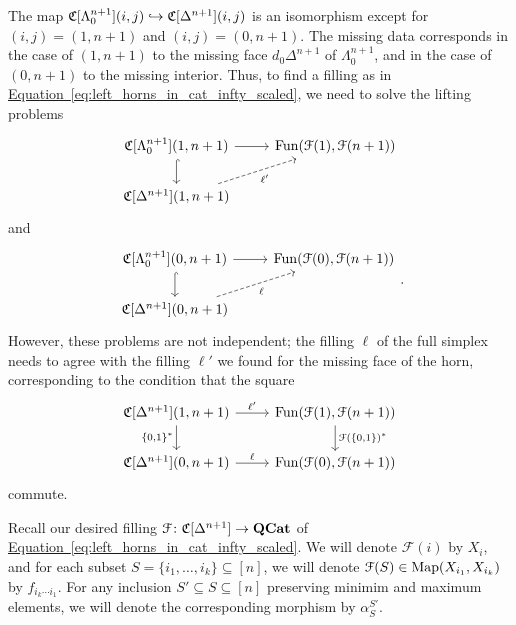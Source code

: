 \documentclass[main.tex]{subfiles}
\begin{document}
The map $\mathfrak{C}[\Lambda^{n+1}_{0}](i, j) \hookrightarrow \mathfrak{C}[\Delta^{n+1}](i, j)$ is an isomorphism except for $(i, j) = (1, n+1)$ and $(i, j) = (0, n+1)$. The missing data corresponds in the case of $(1, n+1)$ to the missing face $d_{0}\Delta^{n+1}$ of $\Lambda^{n+1}_{0}$, and in the case of $(0, n+1)$ to the missing interior. Thus, to find a filling as in \hyperref[eq:left_horns_in_cat_infty_scaled]{Equation~\ref*{eq:left_horns_in_cat_infty_scaled}}, we need to solve the lifting problems
\begin{equation}
  \label{eq:lifting_problem_1}
  \begin{tikzcd}
    \C[\Lambda^{n+1}_{0}](1, n+1)
    \arrow[r]
    \arrow[d, hook]
    & \Fun(\mathcal{F}(1), \mathcal{F}(n+1))
    \\
    \C[\Delta^{n+1}](1, n+1)
    \arrow[ur, dashed, swap, "\ell'"]
  \end{tikzcd}
\end{equation}
and
\begin{equation}
  \label{eq:lifting_problem_2}
  \begin{tikzcd}
    \C[\Lambda^{n+1}_{0}](0, n+1)
    \arrow[r]
    \arrow[d, hook]
    & \Fun(\mathcal{F}(0), \mathcal{F}(n+1))
    \\
    \C[\Delta^{n+1}](0, n+1)
    \arrow[ur, dashed, swap, "\ell"]
  \end{tikzcd}.
\end{equation}
However, these problems are not independent; the filling $\ell$ of the full simplex needs to agree with the filling $\ell'$ we found for the missing face of the horn, corresponding to the condition that the square
\begin{equation}
  \label{eq:lifting_problem_compatibility_condition}
  \begin{tikzcd}
    \C[\Delta^{n+1}](1, n+1)
    \arrow[r, "\ell'"]
    \arrow[d, swap, "{\{0,1\}}^{*}"]
    & \Fun(\mathcal{F}(1), \mathcal{F}(n+1))
    \arrow[d, "\mathcal{F}({\{0, 1\}})^{*}"]
    \\
    \C[\Delta^{n+1}](0, n+1)
    \arrow[r, "\ell"]
    & \Fun(\mathcal{F}(0), \mathcal{F}(n+1))
  \end{tikzcd}
\end{equation}
commute.

\begin{notation}
  \label{notation:simplicial_lifting}
  Recall our desired filling $\mathcal{F}\colon \mathfrak{C}[\Delta^{n+1}] \to \mathbf{QCat}$ of \hyperref[eq:left_horns_in_cat_infty_scaled]{Equation~\ref*{eq:left_horns_in_cat_infty_scaled}}. We will denote $\mathcal{F}(i)$ by $X_{i}$, and for each subset $S = \{i_{1}, \ldots, i_{k}\} \subseteq [n]$, we will denote $\mathcal{F}(S) \in \mathrm{Map}(X_{i_{1}}, X_{i_{k}})$ by $f_{i_{k}\cdots i_{1}}$. For any inclusion $S' \subseteq S \subseteq [n]$ preserving minimim and maximum elements, we will denote the corresponding morphism by $\alpha^{S'}_{S}$.
\end{notation}
\end{document}
